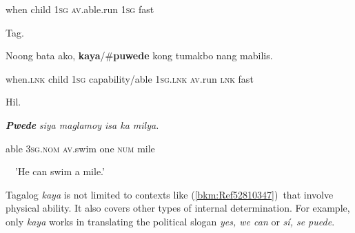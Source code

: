 \begin{stylelsIMT}
when child 1\textsc{sg} \textsc{av}.able.run 1\textsc{sg} fast\ \ 
\end{stylelsIMT}

\begin{listWWNumiileveli}
\item 
\begin{listWWNumiilevelii}
\item 
\begin{stylelsLanginfo}
Tag.
\end{stylelsLanginfo}
\end{listWWNumiilevelii}
\end{listWWNumiileveli}
\begin{stylelsSourceline}
Noong bata ako, \textbf{kaya}/\#\textbf{puwede} kong tumakbo nang mabilis.
\end{stylelsSourceline}

\begin{styleStandard}
when.\textsc{lnk} child 1\textsc{sg} capability/able 1\textsc{sg.lnk av}.run\textsc{ lnk} fast
\end{styleStandard}

\begin{listWWNumiileveli}
\item 
\begin{stylelsLanginfo}
\label{bkm:Ref53237707}Hil.
\end{stylelsLanginfo}
\end{listWWNumiileveli}
\begin{stylelsLanginfo}
\textbf{\textit{Pwede}}\textit{ siya maglamoy isa ka milya.}
\end{stylelsLanginfo}

\begin{stylelsLanginfo}
able 3\textsc{sg.nom} \textsc{av}.swim one \textsc{num} mile
\end{stylelsLanginfo}

\begin{stylelsLanginfo}
\ \ {}'He can swim a mile.'
\end{stylelsLanginfo}

\begin{styleStandard}
Tagalog \textit{kaya} is not limited to contexts like (\ref{bkm:Ref52810347})\ that involve physical ability. It also covers other types of internal determination. For example, only \textit{kaya} works in translating the political slogan \textit{yes, we can} or \textit{sí, se puede}.
\end{styleStandard}

